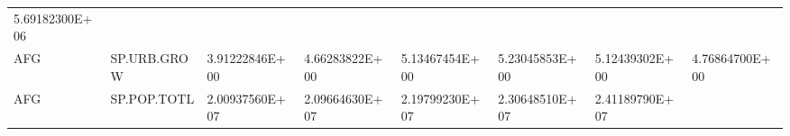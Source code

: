 \documentclass[]{article}
\begin{document}
\begin{longtable}[]{@{}llllllll@{}}
\begin{minipage}[t]{0.11\columnwidth}
5.69182300E+06\strut
\end{minipage}\tabularnewline
\begin{minipage}[t]{0.06\columnwidth}\raggedright
AFG\strut
\end{minipage} & \begin{minipage}[t]{0.08\columnwidth}\raggedright
SP.URB.GROW\strut
\end{minipage} & \begin{minipage}[t]{0.11\columnwidth}\raggedright
3.91222846E+00\strut
\end{minipage} & \begin{minipage}[t]{0.11\columnwidth}\raggedright
4.66283822E+00\strut
\end{minipage} & \begin{minipage}[t]{0.11\columnwidth}\raggedright
5.13467454E+00\strut
\end{minipage} & \begin{minipage}[t]{0.11\columnwidth}\raggedright
5.23045853E+00\strut
\end{minipage} & \begin{minipage}[t]{0.11\columnwidth}\raggedright
5.12439302E+00\strut
\end{minipage} & \begin{minipage}[t]{0.11\columnwidth}\raggedright
4.76864700E+00\strut
\end{minipage}\tabularnewline
\begin{minipage}[t]{0.06\columnwidth}\raggedright
AFG\strut
\end{minipage} & \begin{minipage}[t]{0.08\columnwidth}\raggedright
SP.POP.TOTL\strut
\end{minipage} & \begin{minipage}[t]{0.11\columnwidth}\raggedright
2.00937560E+07\strut
\end{minipage} & \begin{minipage}[t]{0.11\columnwidth}\raggedright
2.09664630E+07\strut
\end{minipage} & \begin{minipage}[t]{0.11\columnwidth}\raggedright
2.19799230E+07\strut
\end{minipage} & \begin{minipage}[t]{0.11\columnwidth}\raggedright
2.30648510E+07\strut
\end{minipage} & \begin{minipage}[t]{0.11\columnwidth}\raggedright
2.41189790E+07\strut
\end{minipage} & \begin{minipage}[t]{0.11\columnwidth}\raggedright

\end{minipage}
\end{longtable}
\end{document}
